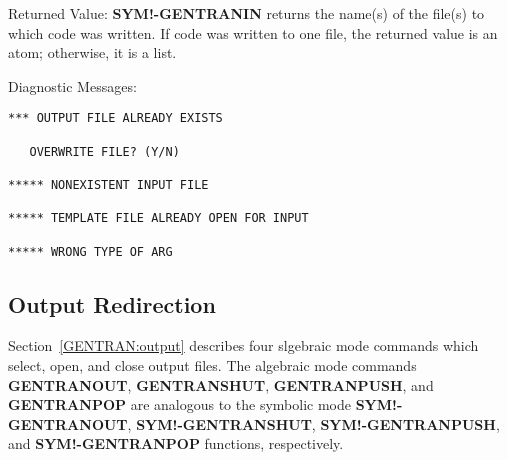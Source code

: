 \begin{describe}{Returned Value:}
{\bf SYM!-GENTRANIN} returns the name(s) of the file(s) to which code was
written.  If code was written to one file, the returned value is an atom;
otherwise, it is a list.
\end{describe}
\begin{describe}{Diagnostic Messages:}
\begin{verbatim}
*** OUTPUT FILE ALREADY EXISTS

   OVERWRITE FILE? (Y/N)

***** NONEXISTENT INPUT FILE

***** TEMPLATE FILE ALREADY OPEN FOR INPUT

***** WRONG TYPE OF ARG
\end{verbatim}
\end{describe}

\subsection{Output Redirection}
Section~\ref{GENTRAN:output} describes four slgebraic mode commands
which select, open, and close output files.  The algebraic mode commands
 
 
{\bf GENTRANOUT}, {\bf GENTRANSHUT}, {\bf GENTRANPUSH}, and {\bf
GENTRANPOP} are analogous to the symbolic mode {\bf
SYM!-GENTRANOUT}, {\bf SYM!-GENTRANSHUT}, {\bf SYM!-GENTRANPUSH}, and
{\bf SYM!-GENTRANPOP} functions, respectively.

